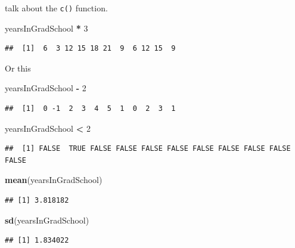 \documentclass[]{book}
\newenvironment{Shaded}{\begin{snugshade}}{\end{snugshade}}
\newcommand{\KeywordTok}[1]{\textcolor[rgb]{0.13,0.29,0.53}{\textbf{#1}}}
\newcommand{\DecValTok}[1]{\textcolor[rgb]{0.00,0.00,0.81}{#1}}
\newcommand{\StringTok}[1]{\textcolor[rgb]{0.31,0.60,0.02}{#1}}
\newcommand{\OperatorTok}[1]{\textcolor[rgb]{0.81,0.36,0.00}{\textbf{#1}}}
\newcommand{\NormalTok}[1]{#1}
\theoremstyle{definition}
\theoremstyle{definition}
\theoremstyle{definition}
\theoremstyle{remark}
\begin{document}
talk about the \texttt{c()} function.

\begin{Shaded}
\begin{Highlighting}[]
\NormalTok{yearsInGradSchool }\OperatorTok{*}\StringTok{ }\DecValTok{3}
\end{Highlighting}
\end{Shaded}

\begin{verbatim}
##  [1]  6  3 12 15 18 21  9  6 12 15  9
\end{verbatim}

Or this

\begin{Shaded}
\begin{Highlighting}[]
\NormalTok{yearsInGradSchool }\OperatorTok{-}\StringTok{ }\DecValTok{2}
\end{Highlighting}
\end{Shaded}

\begin{verbatim}
##  [1]  0 -1  2  3  4  5  1  0  2  3  1
\end{verbatim}

\begin{Shaded}
\begin{Highlighting}[]
\NormalTok{yearsInGradSchool }\OperatorTok{<}\StringTok{ }\DecValTok{2}
\end{Highlighting}
\end{Shaded}

\begin{verbatim}
##  [1] FALSE  TRUE FALSE FALSE FALSE FALSE FALSE FALSE FALSE FALSE FALSE
\end{verbatim}

\begin{Shaded}
\begin{Highlighting}[]
\KeywordTok{mean}\NormalTok{(yearsInGradSchool)}
\end{Highlighting}
\end{Shaded}

\begin{verbatim}
## [1] 3.818182
\end{verbatim}

\begin{Shaded}
\begin{Highlighting}[]
\KeywordTok{sd}\NormalTok{(yearsInGradSchool)}
\end{Highlighting}
\end{Shaded}

\begin{verbatim}
## [1] 1.834022
\end{verbatim}
\end{document}
